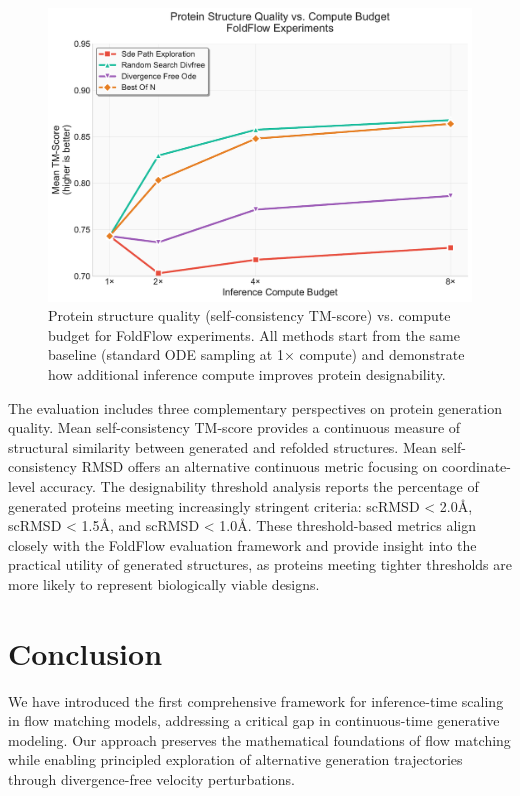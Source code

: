 \documentclass{article}
\begin{document}
\begin{figure}[H]
  \centering
  \includegraphics[width=0.8\linewidth]{figures/protein_scaling_tm_score.pdf}
  \caption{Protein structure quality (self-consistency TM-score) vs. compute budget for FoldFlow experiments. All methods start from the same baseline (standard ODE sampling at 1× compute) and demonstrate how additional inference compute improves protein designability.}
  \label{fig:protein-scaling}
\end{figure}

The evaluation includes three complementary perspectives on protein generation quality. Mean self-consistency TM-score provides a continuous measure of structural similarity between generated and refolded structures. Mean self-consistency RMSD offers an alternative continuous metric focusing on coordinate-level accuracy. The designability threshold analysis reports the percentage of generated proteins meeting increasingly stringent criteria: scRMSD < 2.0Å, scRMSD < 1.5Å, and scRMSD < 1.0Å. These threshold-based metrics align closely with the FoldFlow evaluation framework and provide insight into the practical utility of generated structures, as proteins meeting tighter thresholds are more likely to represent biologically viable designs.


\section{Conclusion}

We have introduced the first comprehensive framework for inference-time scaling in flow matching models, addressing a critical gap in continuous-time generative modeling. Our approach preserves the mathematical foundations of flow matching while enabling principled exploration of alternative generation trajectories through divergence-free velocity perturbations.
\end{document}
